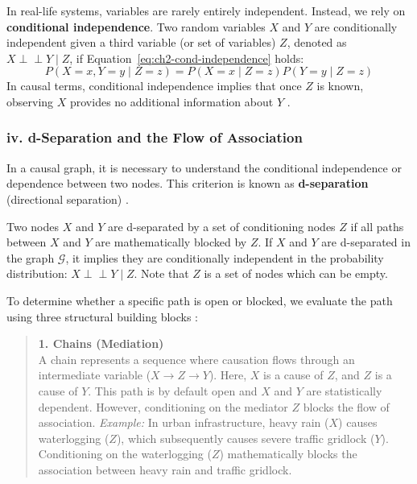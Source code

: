 In real-life systems, variables are rarely entirely independent. Instead, we rely on \textbf{conditional independence}. Two random variables $X$ and $Y$ are conditionally independent given a third variable (or set of variables) $Z$, denoted as $X \perp\!\!\!\perp Y \mid Z$, if Equation~\eqref{eq:ch2-cond-independence} holds:
\begin{equation}
    \label{eq:ch2-cond-independence}
    P(X=x, Y=y \mid Z=z) = P(X=x \mid Z=z)P(Y=y \mid Z=z)
\end{equation}
In causal terms, conditional independence implies that once $Z$ is known, observing $X$ provides no additional information about $Y$ \cite{wasserman2004}.

\subsubsection*{iv. d-Separation and the Flow of Association}

In a causal graph, it is necessary to understand the conditional independence or dependence between two nodes. This criterion is known as \textbf{d-separation} (directional separation) \cite{neal2020}. 

Two nodes $X$ and $Y$ are d-separated by a set of conditioning nodes $Z$ if all paths between $X$ and $Y$ are mathematically blocked by $Z$. If $X$ and $Y$ are d-separated in the graph $\mathcal{G}$, it implies they are conditionally independent in the probability distribution: $X \perp\!\!\!\perp Y \mid Z$. Note that $Z$ is a set of nodes which can be empty.

To determine whether a specific path is open or blocked, we evaluate the path using three structural building blocks \cite{neal2020}:

\begin{quote}
\textbf{1. Chains (Mediation)}\\
A chain represents a sequence where causation flows through an intermediate variable ($X \rightarrow Z \rightarrow Y$). Here, $X$ is a cause of $Z$, and $Z$ is a cause of $Y$.
This path is by default open and $X$ and $Y$ are statistically dependent. However, conditioning on the mediator $Z$ blocks the flow of association. 
\textit{Example:} In urban infrastructure, heavy rain ($X$) causes waterlogging ($Z$), which subsequently causes severe traffic gridlock ($Y$). Conditioning on the waterlogging ($Z$) mathematically blocks the association between heavy rain and traffic gridlock.

\begin{center}
\end{center}
\end{quote}

